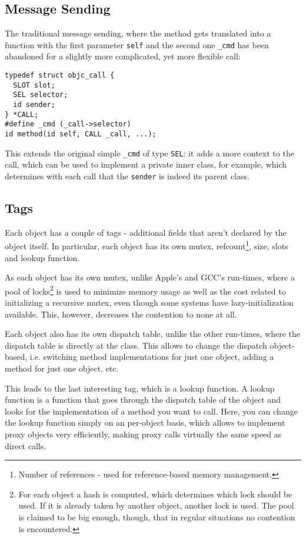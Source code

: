 \subsection{Message Sending}

The traditional message sending, where the method gets translated into a function with the first parameter \verb=self= and the second one \verb=_cmd= has been abandoned for a slightly more complicated, yet more flexible call:

\begin{verbatim}
typedef struct objc_call {
  SLOT slot;
  SEL selector;
  id sender;
} *CALL;
#define _cmd (_call->selector)
id method(id self, CALL _call, ...);
\end{verbatim}

This extends the original simple \verb=_cmd= of type \verb=SEL=: it adds a more context to the call, which can be used to implement a private inner class, for example, which determines with each call that the \verb=sender= is indeed its parent class.

\subsection{Tags}

Each object has a couple of tags - additional fields that aren't declared by the object itself. In particular, each object has its own mutex, refcount\footnote{Number of references - used for reference-based memory management.}, size, slots and lookup function.

As each object has its own mutex, unlike Apple's and GCC's run-times, where a pool of locks\footnote{For each object a hash is computed, which determines which lock should be used. If it is already taken by another object, another lock is used. The pool is claimed to be big enough, though, that in regular situations no contention is encountered.} is used to minimize memory usage as well as the cost related to initializing a recursive mutex, even though some systems have lazy-initialization available. This, however, decreases the contention to none at all.

Each object also has its own dispatch table, unlike the other run-times, where the dispatch table is directly at the class. This allows to change the dispatch object-based, i.e. switching method implementations for just one object, adding a method for just one object, etc.

This leads to the last interesting tag, which is a lookup function. A lookup function is a function that goes through the dispatch table of the object and looks for the implementation of a method you want to call. Here, you can change the lookup function simply on an per-object basis, which allows to implement proxy objects very efficiently, making proxy calls virtually the same speed as direct calls.


